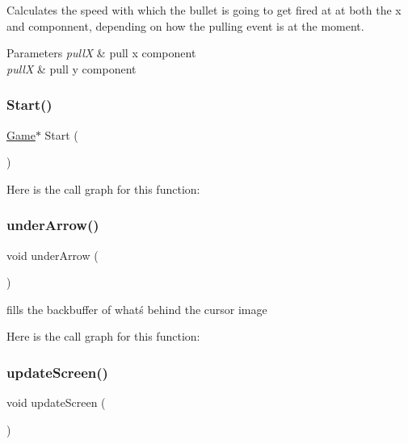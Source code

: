 Calculates the speed with which the bullet is going to get fired at at both the x and componnent, depending on how the pulling event is at the moment. 


\begin{DoxyParams}{Parameters}
{\em pullX} & pull x component \\
\hline
{\em pullX} & pull y component \\
\hline
\end{DoxyParams}
\mbox{\label{group__game_gaaae55be55be73d9c3073893b52530b32}} 
\subsubsection{\texorpdfstring{Start()}{Start()}}
{\footnotesize\ttfamily \mbox{\hyperlink{struct_game}{Game}}$\ast$ Start (\begin{DoxyParamCaption}{ }\end{DoxyParamCaption})}

Here is the call graph for this function\+:
\mbox{\label{group__game_gaa6f544d0a9fe4df07759118388d9ec22}} 
\subsubsection{\texorpdfstring{underArrow()}{underArrow()}}
{\footnotesize\ttfamily void under\+Arrow (\begin{DoxyParamCaption}{ }\end{DoxyParamCaption})}



fills the backbuffer of whatś behind the cursor image 

Here is the call graph for this function\+:
\mbox{\label{group__game_ga192a0a30e5705be3b2800eb7172aa6d4}} 
\subsubsection{\texorpdfstring{updateScreen()}{updateScreen()}}
{\footnotesize\ttfamily void update\+Screen (\begin{DoxyParamCaption}{ }\end{DoxyParamCaption})}



